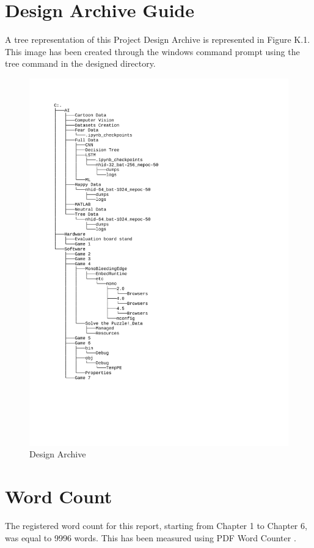 \begin{appendices}
\section{Design Archive Guide}
A tree representation of this Project Design Archive is represented in Figure K.1. This image has been created through the windows command prompt using the tree command in the designed directory.
\vspace*{-17mm}
\setcounter{figure}{0}
\begin{figure}[ht!]%
    \centering
    \includegraphics[page=1,scale=0.88]{images/dirtree.pdf}
    \vspace*{-52mm}
    \caption{Design Archive}%
\end{figure}

\clearpage


\section{Word Count}
The registered word count for this report, starting from Chapter 1 to Chapter 6, was equal to 9996 words. This has been measured using PDF Word Counter \cite{wordcount}.

\end{appendices}